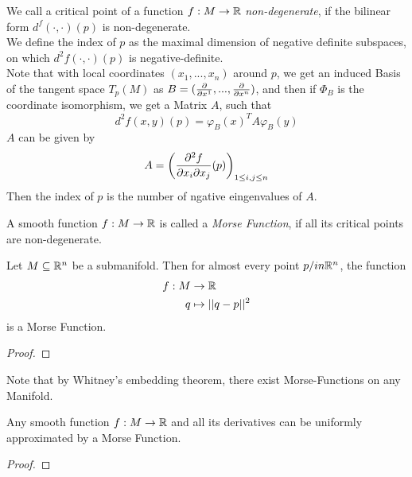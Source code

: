 \begin{definition}
    We call a critical point of a function $f: M \to \R$ \textit{non-degenerate}, if
    the bilinear form $d^f(\cdot, \cdot)(p)$ is non-degenerate. \\
    We define the index of $p$ as the maximal dimension of negative definite subspaces,
    on which $d^2 f (\cdot, \cdot) (p)$ is negative-definite.\\
    Note that with local coordinates $(x_1, ..., x_n)$ around $p$, we get an induced Basis 
    of the tangent space $T_p(M)$ as $B = (\pderive{x^1}, ..., \pderive{x^n})$, and then
    if $\Phi_B$ is the coordinate isomorphism, we get a Matrix $A$, such that
    \[ d^2 f (x, y) (p)  = \varphi_B (x)^T A \varphi_B(y) \]
    $A$ can be given by 
    \[ A = \left(\pdderive[f]{x_i}{x_j}(p)\right)_{1 \leq i, j \leq n} \]
    Then the index of $p$ is the number of ngative eingenvalues of $A$.
\end{definition}

\begin{definition}
    A smooth function $f: M \to \R$ is called a \textit{Morse Function}, if all its critical
    points are non-degenerate.
\end{definition}

\begin{lemma}
    Let $M \subseteq \R^n$ be a submanifold. Then for almost every point $p /in \R^n$,
    the function
    \begin{align*}
        f: M & \to \R \\
        q & \mapsto || q - p ||^2
    \end{align*}
    is a Morse Function.
\end{lemma}

\begin{proof}
\end{proof}

\begin{remark}
    Note that by Whitney's embedding theorem, there exist Morse-Functions on any Manifold.
\end{remark}

\begin{theorem}
    Any smooth function $f: M \to \R$ and all its derivatives can be uniformly approximated
    by a Morse Function.
\end{theorem}

\begin{proof}
\end{proof}

